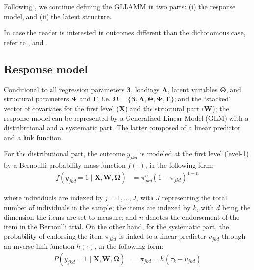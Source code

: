 Following \citet{Rabe_et_al_2004a, Rabe_et_al_2004b}, we continue defining the GLLAMM in two parts: (i) the response model, and (ii) the latent structure.

In case the reader is interested in outcomes different than the dichotomous case, refer to \citet{Rabe_et_al_2004a, Rabe_et_al_2004b, Rabe_et_al_2004c, Skrondal_et_al_2004a}, and \citet{Rabe_et_al_2012}.


\subsection{Response model} \label{s_sect:response}

Conditional to all regression parameters $\pmb{\beta}$, loadings $\pmb{\Lambda}$, latent variables $\pmb{\Theta}$, and structural parameters $\pmb{\Psi}$ and $\pmb{\Gamma}$, i.e. $\pmb{\Omega} = \{ \pmb{\beta}, \pmb{\Lambda}, \pmb{\Theta}, \pmb{\Psi}, \pmb{\Gamma} \}$; and the ``stacked" vector of covariates for the first level ($\mathbf{X}$) and the structural part ($\mathbf{W}$); the response model can be represented by a Generalized Linear Model (GLM) \cite{Nelder_et_al_1972, Nelder_et_al_1989} with a distributional and a systematic part. The latter composed of a linear predictor and a link function.

For the distributional part, the outcome $y_{jkd}$ is modeled at the first level (level-1) by a Bernoulli probability mass function $f(\cdot)$, in the following form:
%
\begin{equation} \label{eq:distributional}
	\begin{split}
		f \left( y_{jkd}=1 \; | \; \mathbf{X}, \mathbf{W}, \pmb{\Omega} \right) &= \pi_{jkd}^{n} (1 - \pi_{jkd})^{1-n}
	\end{split}
\end{equation}

\noindent where individuals are indexed by $j = 1, \dots, J$, with $J$ representing the total number of individuals in the sample; the items are indexed by $k$, with $d$ being the dimension the items are set to measure; and $n$ denotes the endorsement of the item in the Bernoulli trial. On the other hand, for the systematic part, the probability of endorsing the item $\pi_{jkd}$ is linked to a linear predictor $v_{jkd}$ through an inverse-link function $h(\cdot)$, in the following form:
%
\begin{equation} \label{eq:systematic}
	\begin{split}
		P\left( y_{jkd}=1 \; | \; \mathbf{X}, \mathbf{W}, \pmb{\Omega} \right) &= \pi_{jkd} = h( \tau_{k} + v_{jkd} )
	\end{split}	
\end{equation}

